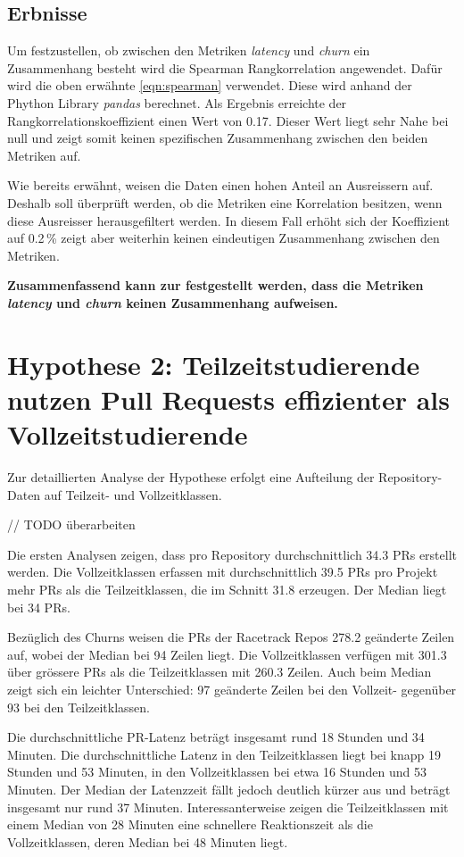 \subsection{Erbnisse}
Um festzustellen, ob zwischen den Metriken \textit{latency} und \textit{churn} ein Zusammenhang besteht wird die Spearman Rangkorrelation angewendet. Dafür wird die oben erwähnte \autoref{eqn:spearman} verwendet. Diese wird anhand der Phython Library \textit{pandas} berechnet. Als Ergebnis erreichte der Rangkorrelationskoeffizient einen Wert von 0.17. Dieser Wert liegt sehr Nahe bei null und zeigt somit keinen spezifischen Zusammenhang zwischen den beiden Metriken auf. 

Wie bereits erwähnt, weisen die Daten einen hohen Anteil an Ausreissern auf. Deshalb soll überprüft werden, ob die Metriken eine Korrelation besitzen, wenn diese Ausreisser herausgefiltert werden. In diesem Fall erhöht sich der Koeffizient auf 0.2\,\% zeigt aber weiterhin keinen eindeutigen Zusammenhang zwischen den Metriken.

\textbf{Zusammenfassend kann zur  festgestellt werden, dass die Metriken \textit{latency} und \textit{churn} keinen Zusammenhang aufweisen.}

\section{Hypothese 2: Teilzeitstudierende nutzen Pull Requests effizienter als Vollzeitstudierende}
Zur detaillierten Analyse der Hypothese erfolgt eine Aufteilung der Repository-Daten auf Teilzeit- und Vollzeitklassen.

// TODO überarbeiten

Die ersten Analysen zeigen, dass pro Repository durchschnittlich 34.3 PRs erstellt werden. Die Vollzeitklassen erfassen mit durchschnittlich 39.5 PRs pro Projekt mehr PRs als die Teilzeitklassen, die im Schnitt 31.8 erzeugen. Der Median liegt bei 34 PRs.

Bezüglich des Churns weisen die PRs der Racetrack Repos 278.2 geänderte Zeilen auf, wobei der Median bei 94 Zeilen liegt. Die Vollzeitklassen verfügen mit 301.3 über grössere PRs als die Teilzeitklassen mit 260.3 Zeilen. Auch beim Median zeigt sich ein leichter Unterschied: 97 geänderte Zeilen bei den Vollzeit- gegenüber 93 bei den Teilzeitklassen. 

Die durchschnittliche PR-Latenz beträgt insgesamt rund 18 Stunden und 34 Minuten. Die durchschnittliche Latenz in den Teilzeitklassen liegt bei knapp 19 Stunden und 53 Minuten, in den Vollzeitklassen bei etwa 16 Stunden und 53 Minuten. Der Median der Latenzzeit fällt jedoch deutlich kürzer aus und beträgt insgesamt nur rund 37 Minuten. Interessanterweise zeigen die Teilzeitklassen mit einem Median von 28 Minuten eine schnellere Reaktionszeit als die Vollzeitklassen, deren Median bei 48 Minuten liegt.

